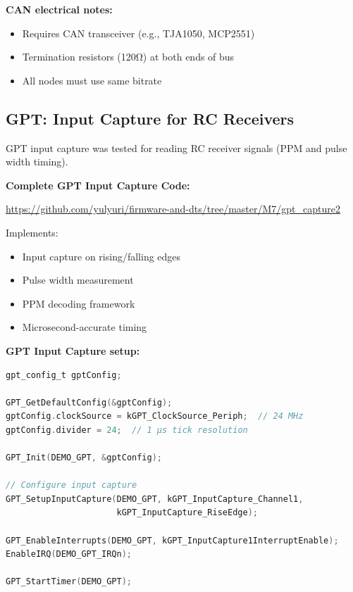 \documentclass[12pt,a4paper]{report}
\begin{document}
\textbf{CAN electrical notes:}
\begin{itemize}
    \item Requires CAN transceiver (e.g., TJA1050, MCP2551)
    \item Termination resistors (120Ω) at both ends of bus
    \item All nodes must use same bitrate
\end{itemize}


\subsection{GPT: Input Capture for RC Receivers}

GPT input capture was tested for reading RC receiver signals (PPM and pulse width timing).

\begin{gitref}
\textbf{Complete GPT Input Capture Code:}

\url{https://github.com/yulyuri/firmware-and-dts/tree/master/M7/gpt_capture2}

Implements:
\begin{itemize}
    \item Input capture on rising/falling edges
    \item Pulse width measurement
    \item PPM decoding framework
    \item Microsecond-accurate timing
\end{itemize}
\end{gitref}

\textbf{GPT Input Capture setup:}
\begin{lstlisting}[language=c]
gpt_config_t gptConfig;

GPT_GetDefaultConfig(&gptConfig);
gptConfig.clockSource = kGPT_ClockSource_Periph;  // 24 MHz
gptConfig.divider = 24;  // 1 µs tick resolution

GPT_Init(DEMO_GPT, &gptConfig);

// Configure input capture
GPT_SetupInputCapture(DEMO_GPT, kGPT_InputCapture_Channel1,
                      kGPT_InputCapture_RiseEdge);

GPT_EnableInterrupts(DEMO_GPT, kGPT_InputCapture1InterruptEnable);
EnableIRQ(DEMO_GPT_IRQn);

GPT_StartTimer(DEMO_GPT);
\end{lstlisting}
\end{document}
